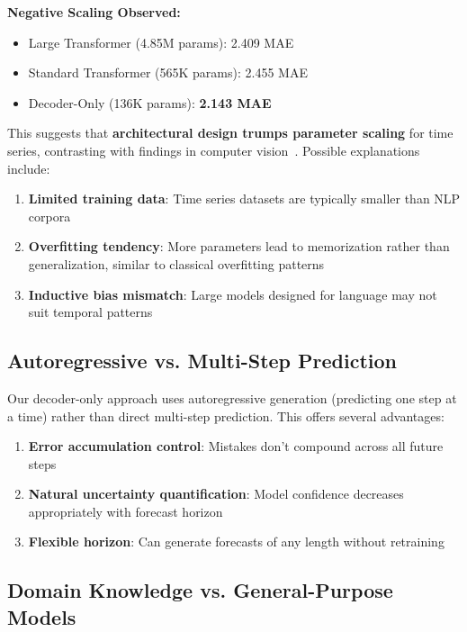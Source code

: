 \documentclass[11pt]{article}
\begin{document}
\textbf{Negative Scaling Observed:}
\begin{itemize}
\item Large Transformer (4.85M params): 2.409 MAE
\item Standard Transformer (565K params): 2.455 MAE
\item Decoder-Only (136K params): \textbf{2.143 MAE}
\end{itemize}

This suggests that \textbf{architectural design trumps parameter scaling} for time series, contrasting with findings in computer vision~\cite{he2016deep}. Possible explanations include:

\begin{enumerate}
\item \textbf{Limited training data}: Time series datasets are typically smaller than NLP corpora
\item \textbf{Overfitting tendency}: More parameters lead to memorization rather than generalization, similar to classical overfitting patterns~\cite{srivastava2014dropout}
\item \textbf{Inductive bias mismatch}: Large models designed for language may not suit temporal patterns
\end{enumerate}

\subsection{Autoregressive vs. Multi-Step Prediction}

Our decoder-only approach uses autoregressive generation (predicting one step at a time) rather than direct multi-step prediction. This offers several advantages:

\begin{enumerate}
\item \textbf{Error accumulation control}: Mistakes don't compound across all future steps
\item \textbf{Natural uncertainty quantification}: Model confidence decreases appropriately with forecast horizon
\item \textbf{Flexible horizon}: Can generate forecasts of any length without retraining
\end{enumerate}

\subsection{Domain Knowledge vs. General-Purpose Models}
\end{document}
